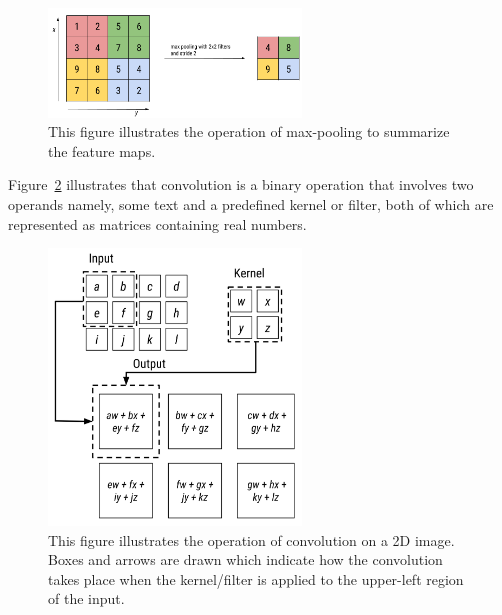 \begin{figure}[!htb]
    \includegraphics[width=0.6\textwidth, center]{Figures/max-pooling.png}
    \caption{This figure illustrates the operation of max-pooling to summarize the feature maps.}
    \label{fig:maxpool}
\end{figure}
Figure~\ref{fig:convolution} illustrates that convolution is a binary operation that involves two operands namely, some text and a predefined kernel or filter, both of which are represented as matrices containing real numbers.
\begin{figure}[!htb]
    \includegraphics[width=0.6\textwidth, center]{Figures/convolution.png}
    \caption{This figure illustrates the operation of convolution on a 2D image. Boxes and arrows are drawn which indicate how the convolution takes place when the kernel/filter is applied to the upper-left region of the input.}
    \label{fig:convolution}
\end{figure}
